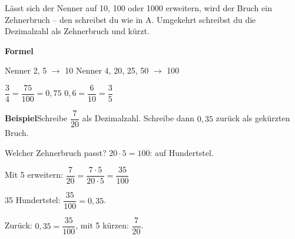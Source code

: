 \documentclass[11pt]{article}
\makeatletter
\newlength{\kr}
\newcommand{\karomerk}[2]{\protected@write\@auxout{}{\string\karoseite{#1}{#2}{\thepage}}}
\newcommand{\karoseite}[3]{\expandafter\xdef\csname karo@#1@#2\endcsname{#3}}
\makeatother
\begin{document}
\ifdim\kr>12mm\karomerk{k}{B}\noindent{\scriptsize\color{mbgrau}Platz zum Rechnen}\par\nointerlineskip\vspace{1mm}\noindent
\begin{tikzpicture}\clip (0,0) rectangle ({\linewidth-0.5mm},\kr);\draw[black!16,line width=0.3pt,step=5mm] (0,0) grid (\linewidth,\kr);\end{tikzpicture}\fi\par
\clearpage\label{s:C}\noindent\colorbox{black!12}{}\hspace{3mm}{\Large\bfseries Bruch und Dezimalzahl: erweitern und kürzen}\par\smallskip
\noindent Lässt sich der Nenner auf 10, 100 oder 1000 erweitern, wird der Bruch ein Zehnerbruch – den schreibst du wie in A. Umgekehrt schreibst du die Dezimalzahl als Zehnerbruch und kürzt.\par\medskip
\noindent\textbf{Formel}\par\nopagebreak\noindent\hspace*{4mm}\begin{minipage}{\dimexpr\linewidth-4mm\relax}Nenner 2, 5 $\to$ 10 \qquad Nenner 4, 20, 25, 50 $\to$ 100 \par\vspace{4pt} $\dfrac{3}{4} = \dfrac{75}{100} = 0{,}75$ \qquad $0{,}6 = \dfrac{6}{10} = \dfrac{3}{5}$\end{minipage}\par\medskip
\noindent\textbf{Beispiel}\quad Schreibe $\dfrac{7}{20}$ als Dezimalzahl. Schreibe dann $0{,}35$ zurück als gekürzten Bruch.\par\smallskip
\noindent\par\noindent{}Welcher Zehnerbruch passt? $20 \cdot 5 = 100$: auf Hundertstel.\par\smallskip\par\noindent{}Mit 5 erweitern: $\dfrac{7}{20} = \dfrac{7 \cdot 5}{20 \cdot 5} = \dfrac{35}{100}$\par\smallskip\par\noindent{}35 Hundertstel: $\dfrac{35}{100} = 0{,}35$.\par\smallskip\par\noindent{}Zurück: $0{,}35 = \dfrac{35}{100}$, mit 5 kürzen: $\dfrac{7}{20}$.\par\smallskip\par\medskip
\end{document}
